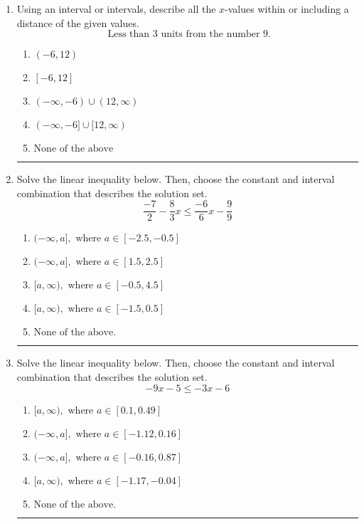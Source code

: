 \documentclass[14pt]{extbook}
\newcommand{\litem}[1]{\item#1\hspace*{-1cm}\rule{\textwidth}{0.4pt}}
\begin{document}
\begin{enumerate}
{\begin{enumerate}[label=\Alph*.]
\end{enumerate} }
\litem{
Using an interval or intervals, describe all the $x$-values within or including a distance of the given values.\[ \text{ Less than } 3 \text{ units from the number } 9. \]\begin{enumerate}[label=\Alph*.]
\item \( (-6, 12) \)
\item \( [-6, 12] \)
\item \( (-\infty, -6) \cup (12, \infty) \)
\item \( (-\infty, -6] \cup [12, \infty) \)
\item \( \text{None of the above} \)

\end{enumerate} }
\litem{
Solve the linear inequality below. Then, choose the constant and interval combination that describes the solution set.\[ \frac{-7}{2} - \frac{8}{3} x \leq \frac{-6}{6} x - \frac{9}{9} \]\begin{enumerate}[label=\Alph*.]
\item \( (-\infty, a], \text{ where } a \in [-2.5, -0.5] \)
\item \( (-\infty, a], \text{ where } a \in [1.5, 2.5] \)
\item \( [a, \infty), \text{ where } a \in [-0.5, 4.5] \)
\item \( [a, \infty), \text{ where } a \in [-1.5, 0.5] \)
\item \( \text{None of the above}. \)

\end{enumerate} }
\litem{
Solve the linear inequality below. Then, choose the constant and interval combination that describes the solution set.\[ -9x -5 \leq -3x -6 \]\begin{enumerate}[label=\Alph*.]
\item \( [a, \infty), \text{ where } a \in [0.1, 0.49] \)
\item \( (-\infty, a], \text{ where } a \in [-1.12, 0.16] \)
\item \( (-\infty, a], \text{ where } a \in [-0.16, 0.87] \)
\item \( [a, \infty), \text{ where } a \in [-1.17, -0.04] \)
\item \( \text{None of the above}. \)


\end{enumerate}}
\end{enumerate}
\end{document}
